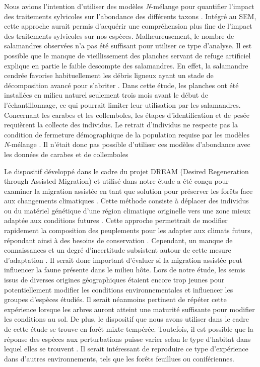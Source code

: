 Nous avions l’intention d’utiliser des modèles \textit{N}-mélange pour quantifier l'impact des traitements sylvicoles sur l'abondance des différents taxons \citep{Royle2004Nmixturemodels,Mazerolle2021Woodlandsalamander}. 
Intégré au SEM, cette approche aurait permis d'acquérir une compréhension plus fine de l'impact des traitements sylvicoles sur nos espèces. 
Malheureusement, le nombre de salamandres observées n'a pas été suffisant pour utiliser ce type d'analyse. 
Il est possible que le manque de vieillissement des planches servant de refuge artificiel explique en partie le faible descompte des salamandres. 
En effet, la salamandre cendrée favorise habituellement les débris ligneux ayant un stade de décomposition avancé pour s'abriter \citep{Otto2011ComparingCover,hedrickEffectsCoverboardAge2021}. 
Dans cette étude, les planches ont été installées en milieu naturel seulement trois mois avant le début de l'échantillonnage, ce qui pourrait limiter leur utilisation par les salamandres. 
Concernant les carabes et les collemboles, les étapes d’identification et de pesée requièrent la collecte des individus. 
Le retrait d’individus ne respecte pas la condition de fermeture démographique de la population requise par les modèles \textit{N}-mélange  \citep{Royle2004Nmixturemodels}. 
Il n’était donc pas possible d’utiliser ces modèles d’abondance avec les données de carabes et de collemboles

Le dispositif développé dans le cadre du projet DREAM (Desired Regeneration through Assisted Migration) et utilisé dans notre étude a été conçu pour examiner la migration assistée en tant que solution pour préserver les forêts face aux changements climatiques \citep{royoDesiredREgenerationAssisted2023}. 
Cette méthode consiste à déplacer des individus ou du matériel génétique d’une région climatique originelle vers une zone mieux adaptée aux conditions futures \citep{Vitt2010Assistedmigration}. 
Cette approche permettrait de modifier rapidement la composition des peuplements pour les adapter aux climats futurs, répondant ainsi à des besoins de conservation \citep{Dumroese2015Considerationsrestoring,Park2018Informationunderload,Park2023Provenancetrials}. 
Cependant, un manque de connaissances et un degré d’incertitude subsistent autour de cette mesure d’adaptation \citep{Klenk2015assistedmigration,Park2018Informationunderload}. 
Il serait donc important d’évaluer si la migration assistée peut influencer la faune présente dans le milieu hôte.
Lors de notre étude, les semis issus de diverses origines géographiques étaient encore trop jeunes pour potentiellement modifier les conditions environnementales et influencer les groupes d’espèces étudiés. 
Il serait néanmoins pertinent de répéter cette expérience lorsque les arbres auront atteint une maturité suffisante pour modifier les conditions au sol. 
De plus, le dispositif que nous avons utiliser dans le cadre de cette étude se trouve en forêt mixte tempérée.
Toutefois, il est possible que la réponse des espèces aux perturbations puisse varier selon le type d'habitat dans lequel elles se trouvent \citep{Kudrin2023metaanalysiseffects}. 
Il serait intéressant de reproduire ce type d'expérience dans d'autres environnements, tels que les forêts feuillues ou conifériennes.


